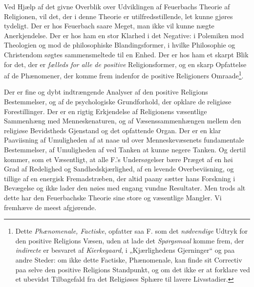 Ved Hjælp af det givne Overblik over Udviklingen af Feuerbachs Theorie af
Religionen, vil det, der i denne Theorie er utilfredsstillende, let kunne gjøres
tydeligt. Der er hos Feuerbach saare Meget, man ikke vil kunne nægte
Anerkjendelse. Der er hos ham en stor Klarhed i det Negative: i Polemiken mod
Theologien og mod de philosophiske Blandingsformer, i hvilke Philosophie og
Christendom søgtes sammensmeltede til en Enhed. Der er hos ham et skarpt Blik for
det, der er \emph{fælleds for alle de positive} Religionsformer, og en skarp
Opfattelse af de Phænomener, der komme frem indenfor de positive Religioners
Omraade\footnote{Dette \emph{Phænomenale, Factiske}, opfatter saa F. som det
\emph{nødvendige} Udtryk for den positive Religions Væsen, uden at lade det
\emph{Spørgsmaal} komme frem, der \emph{indirecte} er besvaret af
\emph{Kierkegaard}, i „Kjærlighedens Gjerninger“ og paa andre Steder: om ikke
dette Factiske, Phænomenale, kan finde sit Correctiv paa selve den positive
Religions Standpunkt, og om det ikke er at forklare ved et ubevidst Tilbagefald
fra det Religiøses Sphære til lavere Livsstadier.}.

 Der er fine og dybt indtrængende Analyser af den positive Religions
Bestemmelser, og af de psychologiske Grundforhold, der opklare de religiøse
Forestillinger. Der er en rigtig Erkjendelse af Religionens væsentlige
Sammenhæng med Menneskenaturen, og af Væsenssammenhængen mellem den religiøse
Bevidstheds Gjenstand og det opfattende Organ. Der er en klar Paaviisning af
Umuligheden af at naae ud over Menneskevæsenets fundamentale Bestemmelser, af
Umuligheden af ved Tanken at kunne negere Tanken. Og dertil kommer, som et
Væsentligt, at alle F.'s Undersøgelser bære Præget af en høi Grad af Redelighed
og Sandhedskjærlighed, af en levende Overbeviisning, og tillige af en energisk
Fremadstræben, der altid paany sætter hans Forskning i Bevægelse og ikke lader
den nøies med engang vundne Resultater. Men trods alt dette har den Feuerbachske
Theorie sine store og væsentlige Mangler. Vi fremhæve de meest afgjørende.

